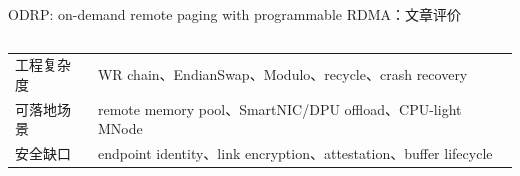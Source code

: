 \begin{frame}[t,shrink=6]{ODRP: on-demand remote paging with programmable RDMA：文章评价}
\begin{columns}[T,totalwidth=\textwidth]
\begin{column}{0.49\textwidth}
{\begin{minipage}[t]{0.97\linewidth}
\begin{minipage}{0.92\linewidth}
{\begin{tabularx}{\linewidth}{@{}YY@{}}
工程复杂度 & WR chain、EndianSwap、Modulo、recycle、crash recovery \\
可落地场景 & remote memory pool、SmartNIC/DPU offload、CPU-light MNode \\
安全缺口 & endpoint identity、link encryption、attestation、buffer lifecycle \\
\bottomrule
\end{tabularx}
}
    \end{minipage}
    \vspace{1mm}
  \end{minipage}}
  \end{column}
\end{columns}
\end{frame}


